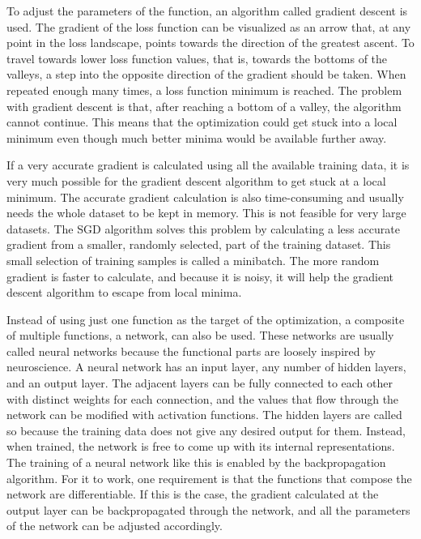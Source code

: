 To adjust the parameters of the function, an algorithm called gradient descent is used. The gradient of the loss function can be visualized as an arrow that, at any point in the loss landscape, points towards the direction of the greatest ascent. To travel towards lower loss function values, that is, towards the bottoms of the valleys, a step into the opposite direction of the gradient should be taken. When repeated enough many times, a loss function minimum is reached. The problem with gradient descent is that, after reaching a bottom of a valley, the algorithm cannot continue. This means that the optimization could get stuck into a local minimum even though much better minima would be available further away. \cite{Goodfellow2016,LeCun2015}

If a very accurate gradient is calculated using all the available training data, it is very much possible for the gradient descent algorithm to get stuck at a local minimum. The accurate gradient calculation is also time-consuming and usually needs the whole dataset to be kept in memory. This is not feasible for very large datasets. The \ac{SGD} algorithm solves this problem by calculating a less accurate gradient from a smaller, randomly selected, part of the training dataset. This small selection of training samples is called a minibatch. The more random gradient is faster to calculate, and because it is noisy, it will help the gradient descent algorithm to escape from local minima. \cite{Goodfellow2016,LeCun2015}

Instead of using just one function as the target of the optimization, a composite of multiple functions, a network, can also be used. These networks are usually called neural networks because the functional parts are loosely inspired by neuroscience. A neural network has an input layer, any number of hidden layers, and an output layer. The adjacent layers can be fully connected to each other with distinct weights for each connection, and the values that flow through the network can be modified with activation functions. The hidden layers are called so because the training data does not give any desired output for them. Instead, when trained, the network is free to come up with its internal representations. The training of a neural network like this is enabled by the backpropagation algorithm. For it to work, one requirement is that the functions that compose the network are differentiable. If this is the case, the gradient calculated at the output layer can be backpropagated through the network, and all the parameters of the network can be adjusted accordingly. \cite{Goodfellow2016,LeCun2015}

